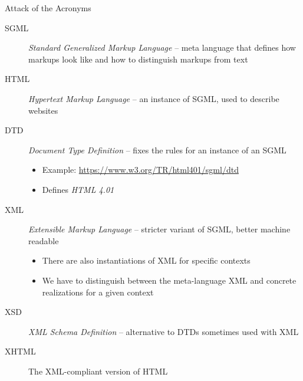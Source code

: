 
\begin{frame}{Attack of the Acronyms}
%
\begin{description}
\item[SGML] \emph{Standard Generalized Markup Language} -- meta language that defines how markups look like and how to distinguish markups from text
\pause
\item[HTML] \emph{Hypertext Markup Language} -- an instance of SGML, used to describe websites
\pause
\item[DTD]  \emph{Document Type Definition} -- fixes the rules for an instance of an SGML
	\begin{itemize}
	\item Example: \url{https://www.w3.org/TR/html401/sgml/dtd}
	\item Defines \emph{HTML 4.01}
	\end{itemize}
\pause
\item[XML]  \emph{Extensible Markup Language} -- stricter variant of SGML, better machine readable
	\begin{itemize}
	\item There are also instantiations of XML for specific contexts
	\item[\Thus] We have to distinguish between the meta-language XML and concrete realizations for a given context
	\end{itemize}
\pause
\item[XSD]  \emph{XML Schema Definition} -- alternative to DTDs sometimes used with XML
\pause
\item[XHTML] The XML-compliant version of HTML
\end{description}
%
\end{frame}


